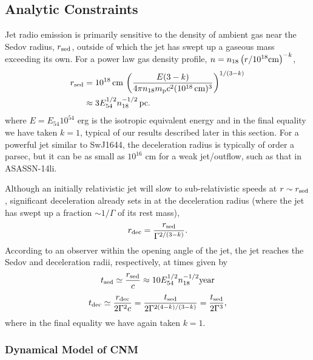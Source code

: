 \documentclass[usenatbib,fleqn]{mnras}
\begin{document}
\subsection{Analytic Constraints}
\label{sec:analy}


Jet radio emission is primarily sensitive to the density of ambient
gas near the Sedov radius, $r_{\rm sed}$, outside of which the jet has
swept up a gaseous mass exceeding its own. For a power law gas density
profile, $n= n_{18} \left(r/10^{18} {\rm cm}\right)^{-k}$,
\begin{align}
  r_{\rm sed} &= 10^{18} \,{\rm cm}\, \left( \frac{E(3-k)}{4\pi n_{18}
      m_{\rm p} c^2 (10^{18}\,{\rm cm})^3} \right)^{1/(3-k)}  \nonumber\\
  &\approx 3 E_{54}^{1/2} n_{\rm 18}^{-1/2}\,{\rm pc}.
  \label{eq:rdec}
\end{align}
where $E = E_{54}10^{54}$ erg is the isotropic equivalent energy and
in the final equality we have taken $k = 1$, typical of our results
described later in this section.  For a powerful jet similar to
SwJ1644, the deceleration radius is typically of order a parsec, but
it can be as small as $10^{16}$ cm for a weak jet/outflow, such as
that in ASASSN-14li.

Although an initially relativistic jet will slow to sub-relativistic
speeds at $r \sim r_{\rm sed}$, significant deceleration already sets
in at the deceleration radius (where the jet has swept up a
fraction $\sim 1/\Gamma$ of its rest mass),
\begin{equation}
  r_{\rm dec}=\frac{r_{\rm sed}}{\Gamma^{2/(3-k)}}.
  \label{eq:rdec2}
\end{equation}
According to an observer within the opening angle of the jet, the jet
reaches the Sedov and deceleration radii, respectively, at times given
by
\begin{equation}
t_{\rm sed} \simeq \frac{r_{\rm sed}}{c} \approx
10 E_{54}^{1/2}n_{18}^{-1/2} {\rm year}
 \end{equation} 
\begin{equation}
t_{\rm dec} \simeq
\frac{r_{\rm dec}}{2\Gamma^{2} c} = \frac{t_{\rm
    sed}}{2\Gamma^{2(4-k)/(3-k)}} = \frac{t_{\rm sed}}{2\Gamma^{3}},
 \label{eq:tdec}
\end{equation}
%
where in the final equality we have again taken $k = 1$. 


\subsubsection{Dynamical Model of CNM}
\label{sec:model}
\end{document}
